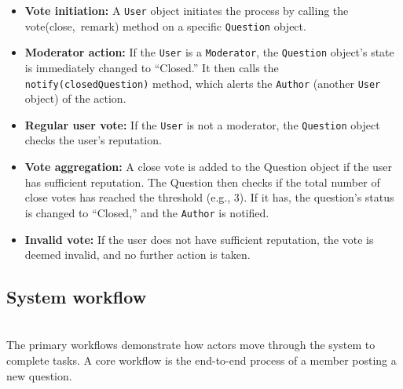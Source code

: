 \begin{itemize}
\item
\protect{}\label{GZTtFtm6vgQxWubQn1Ut8}
\textbf{Vote initiation:} A \texttt{User} object initiates the process by calling the vote(close,\ remark) method on a specific \texttt{Question} object.
\item
\protect{}\label{4o966fVc9FAgx6khEjs15}
\textbf{Moderator action:} If the \texttt{User} is a \texttt{Moderator}, the \texttt{Question} object's state is immediately changed to ``Closed.'' It then calls the \texttt{notify(closedQuestion)} method, which alerts the \texttt{Author} (another \texttt{User} object) of the action.
\item
\protect{}\label{H7HWJYIbBDwEhmizPFbLv}
\textbf{Regular user vote:} If the \texttt{User} is not a moderator, the \texttt{Question} object checks the user's reputation.
\item
\protect{}\label{hYPuruPktN2DYnbUVtKNw}
\textbf{Vote aggregation:} A close vote is added to the Question object if the user has sufficient reputation. The Question then checks if the total number of close votes has reached the threshold (e.g., 3). If it has, the question's status is changed to ``Closed,'' and the \texttt{Author} is notified.
\item
\protect{}\label{UY3wEUt1ULwOFHGevvlzq}
\textbf{Invalid vote:} If the user does not have sufficient reputation, the vote is deemed invalid, and no further action is taken.
\end{itemize}

\subsection{System workflow}\label{8HUzAELdhNE3MbSOLqLwK}
\\
The primary workflows demonstrate how actors move through the system to complete tasks. A core workflow is the end-to-end process of a member posting a new question.

